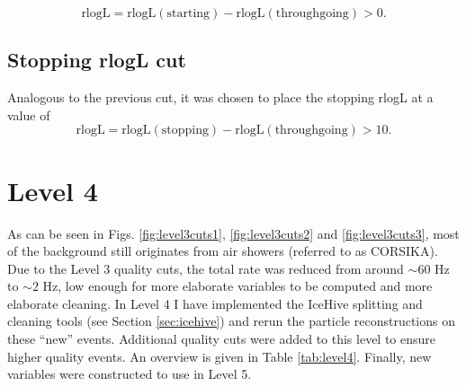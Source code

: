 \begin{equation}
\textrm{rlogL} = \textrm{rlogL}(\textrm{starting}) - \textrm{rlogL}(\textrm{throughgoing}) > 0. 
\end{equation}

\subsection{Stopping rlogL cut}
Analogous to the previous cut, it was chosen to place the stopping rlogL at a value of
\begin{equation}
\textrm{rlogL} = \textrm{rlogL}(\textrm{stopping}) - \textrm{rlogL}(\textrm{throughgoing}) > 10. 
\end{equation}


\section{Level 4}
As can be seen in Figs. \ref{fig:level3cuts1}, \ref{fig:level3cuts2} and \ref{fig:level3cuts3}, most of the background still originates from air showers (referred to as CORSIKA). Due to the Level 3 quality cuts, the total rate was reduced from around $\sim 60$ Hz to $\sim2$ Hz, low enough for more elaborate variables to be computed and more elaborate cleaning. In Level 4 I have implemented the IceHive splitting and cleaning tools (see Section \ref{sec:icehive}) and rerun the particle reconstructions on these ``new'' events. Additional quality cuts were added to this level to ensure higher quality events. An overview is given in Table \ref{tab:level4}. Finally, new variables were constructed to use in Level 5.

